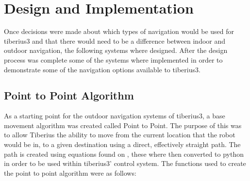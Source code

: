 \section{Design and Implementation}
Once decisions were made about which types of navigation would be used for \gls{tiberius3} and that there would need to be a difference between indoor and outdoor navigation, the following systems where designed. After the design process was complete some of the systems where implemented in order to demonstrate some of the navigation options available to \gls{tiberius3}. 
\subsection{Point to Point Algorithm}
\label{sec:nav_design_p2p} %
As a starting point for the outdoor navigation systems of \gls{tiberius3}, a base movement algorithm was created called Point to Point. The purpose of this was to allow Tiberius the ability to move from the current location that the robot would be in, to a given destination using a direct, effectively straight path. The path is created using equations found on \cite{lat-long-points}, these where then converted to python in order to be used within \gls{tiberius3}' control system. The functions used to create the point to point algorithm were as follows:
